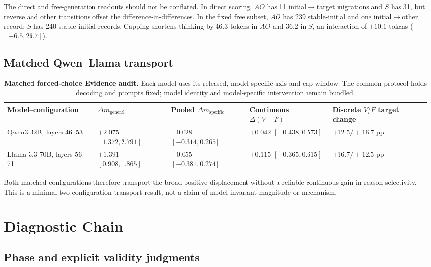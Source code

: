 \documentclass[letterpaper]{article}
\begin{document}
The direct and free-generation readouts should not be conflated.  In direct scoring, $AO$ has 11 initial$\rightarrow$target migrations and $S$ has 31, but reverse and other transitions offset the difference-in-differences.  In the fixed free subset, $AO$ has 239 stable-initial and one initial$\rightarrow$other record; $S$ has 240 stable-initial records.  Capping shortens thinking by 46.3 tokens in $AO$ and 36.2 in $S$, an interaction of $+10.1$ tokens ($[-6.5,26.7]$).

\subsection{Matched Qwen--Llama transport}

\begin{table}[t]
\centering
\small
\begin{tabular}{L{3.3cm}L{3.0cm}L{3.0cm}L{3.0cm}L{2.4cm}}
\toprule
Model--configuration & $\Delta m_{\mathrm{general}}$ & Pooled $\Delta m_{\mathrm{specific}}$ & Continuous $\Delta(V-F)$ & Discrete $V/F$ target change \\
\midrule
Qwen3-32B, layers 46--53 & $+2.075$ $[1.372,2.791]$ & $-0.028$ $[-0.314,0.265]$ & $+0.042$ $[-0.438,0.573]$ & $+12.5/+16.7$ pp \\
Llama-3.3-70B, layers 56--71 & $+1.391$ $[0.908,1.865]$ & $-0.055$ $[-0.381,0.274]$ & $+0.115$ $[-0.365,0.615]$ & $+16.7/+12.5$ pp \\
\bottomrule
\end{tabular}
\caption{\textbf{Matched forced-choice Evidence audit.} Each model uses its released, model-specific axis and cap window.  The common protocol holds decoding and prompts fixed; model identity and model-specific intervention remain bundled.}
\label{tab:supp-xm}
\end{table}

Both matched configurations therefore transport the broad positive displacement without a reliable continuous gain in reason selectivity.  This is a minimal two-configuration transport result, not a claim of model-invariant magnitude or mechanism.

\section{Diagnostic Chain}
\label{supp:diagnostics}

\subsection{Phase and explicit validity judgments}
\end{document}
